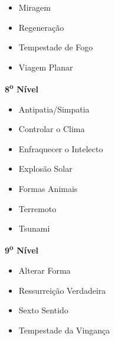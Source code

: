 \documentclass[a4paper,12p]{book}
\begin{document}
\begin{multicols}{4}
{\begin{itemize}
				\item Miragem
				\item Regeneração
				\item Tempestade de Fogo
				\item Viagem Planar
			\end{itemize}
		\textbf{8\textsuperscript{o} Nível}
			\begin{itemize}
				\item Antipatia/Simpatia
				\item Controlar o Clima
				\item Enfraquecer o Intelecto
				\item Explosão Solar
				\item Formas Animais
				\item Terremoto
				\item Tsunami
			\end{itemize}
		\textbf{9\textsuperscript{o} Nível}
			\begin{itemize}
				\item Alterar Forma
				\item Ressurreição Verdadeira
				\item Sexto Sentido
				\item Tempestade da Vingança
			\end{itemize}}
		\end{multicols}
\end{document}
